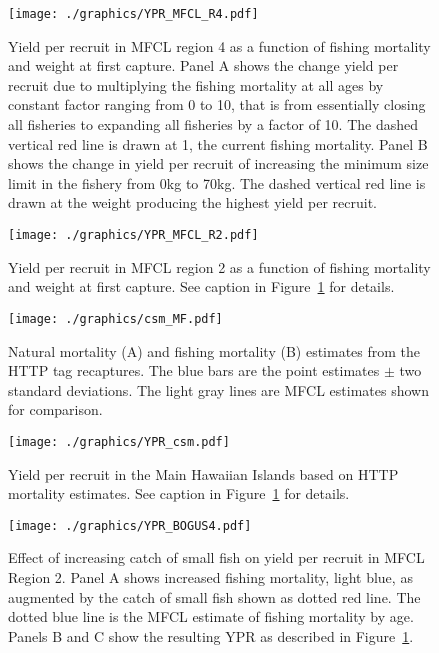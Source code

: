 \documentclass[12pt,letterpaper]{article}
\begin{document}
\begin{figure}
\begin{center}
\texttt{[image: ./graphics/YPR\_MFCL\_R4.pdf]}
\caption{\label{fig:r4ypr}
Yield per recruit in MFCL region 4 as a function of fishing mortality
and weight at first capture.
Panel A shows the change yield per recruit due to multiplying
the fishing mortality at all ages by constant factor ranging from 0 to
10, that is from essentially closing all fisheries to expanding all
fisheries by a factor of 10. 
The dashed vertical red line is drawn at 1, the current fishing mortality.
Panel B shows the change in yield per recruit of increasing
the minimum size limit in the fishery from 0kg to 70kg. 
The dashed vertical red line is drawn at the weight producing the
highest yield per recruit.
}
\end{center}
\end{figure}

\begin{figure}
\begin{center}
\texttt{[image: ./graphics/YPR\_MFCL\_R2.pdf]}
\caption{\label{fig:r2ypr}
Yield per recruit in MFCL region 2 as a function of fishing mortality
and weight at first capture. 
See caption in Figure~\ref{fig:r4ypr} for details.
}
\end{center}
\end{figure}

\begin{figure}
\begin{center}
\texttt{[image: ./graphics/csm\_MF.pdf]}
\caption{\label{fig:csmmf}
Natural mortality (A) and fishing mortality (B) estimates from the 
HTTP tag recaptures.
The blue bars are the point estimates $\pm$ two standard deviations.
The light gray lines are MFCL estimates shown for comparison.
}
\end{center}
\end{figure}

\begin{figure}
\begin{center}
\texttt{[image: ./graphics/YPR\_csm.pdf]}
\caption{\label{fig:yprcsm}
Yield per recruit in the Main Hawaiian Islands based on HTTP mortality
estimates. 
See caption in Figure~\ref{fig:r4ypr} for details.
}
\end{center}
\end{figure}

\begin{figure}
\begin{center}
\texttt{[image: ./graphics/YPR\_BOGUS4.pdf]}
\caption{\label{fig:yprbogus}
Effect of increasing catch of small fish on yield per recruit in MFCL
Region 2.
Panel A shows increased fishing mortality, light blue,
as augmented by the catch of
small fish shown as dotted red line. The dotted blue line is the MFCL
estimate of fishing mortality by age.
Panels B and C show the resulting YPR as described in
Figure~\ref{fig:r4ypr}.
}
\end{center}
\end{figure}
\end{document}
